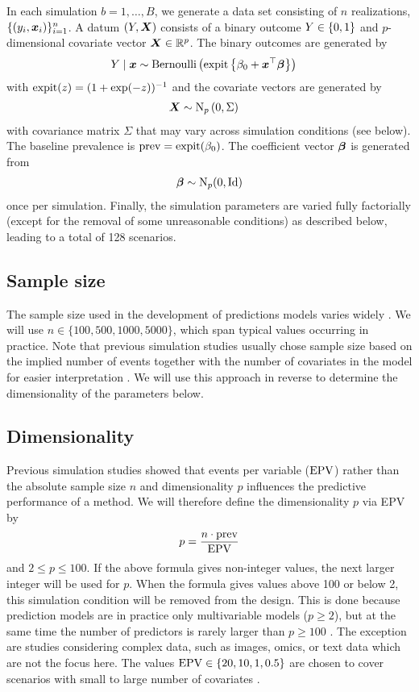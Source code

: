 In each simulation $b = 1, \dots, B$, we generate a data set consisting of $n$
realizations, \ie $\{(y_i, \text{\boldmath$x$}_i)\}_{i=1}^n$. A datum $(Y, \text{\boldmath$X$})$ consists of
a binary outcome $Y \in \{0, 1\}$ and $p$-dimensional covariate vector
$\text{\boldmath$X$} \in \mathbb{R}^p$. The binary outcomes are generated by
\begin{align*}
  Y \mid \text{\boldmath$x$} &\sim \operatorname{Bernoulli}\left(\operatorname{expit}\left\{\beta_0 +
	\text{\boldmath$x$}^\top\text{\boldmath$\beta$}\right\}\right)
\end{align*}
with $\operatorname{expit}(z) = (1 + \exp(-z))^{-1}$ and the covariate vectors are generated by
\begin{align*}
  \text{\boldmath$X$} &\sim \operatorname{N}_p\left(0, \Sigma\right)
\end{align*}
with covariance matrix $\Sigma$ that may vary across simulation conditions (see
below). The baseline prevalence is $\operatorname{prev} = \operatorname{expit}(\beta_0)$. The coefficient
vector $\text{\boldmath$\beta$}$ is generated from
\begin{align*}
  \text{\boldmath$\beta$} \sim \operatorname{N}_p(0, \operatorname{Id})
\end{align*}
once per simulation. Finally, the simulation parameters are varied fully
factorially (except for the removal of some unreasonable conditions) as
described below, leading to a total of 128 scenarios.

\subsection*{Sample size}
The sample size used in the development of predictions models varies widely
\citep{Damen2016}. We will use $n \in \{100, 500, 1000, 5000\}$, which span
typical values occurring in practice. Note that previous simulation studies
usually chose sample size based on the implied number of events together with
the number of covariates in the model for easier interpretation
\citep{vanSmeden2018, Riley2018}. We will use this approach in reverse to
determine the dimensionality of the parameters below.

\subsection*{Dimensionality}
Previous simulation studies showed that events per variable ($\operatorname{EPV}$) rather than
the absolute sample size $n$ and dimensionality $p$ influences the predictive
performance of a method. We will therefore define the dimensionality $p$ via EPV
by $$p = \frac{n \cdot \operatorname{prev}}{\operatorname{EPV}}$$ and $2 \leq p \leq 100.$ If the above
formula gives non-integer values, the next larger integer will be used for $p$.
When the formula gives values above 100 or below 2, this simulation condition
will be removed from the design. This is done because prediction models are in
practice only multivariable models ($p \geq 2$), but at the same time the number
of predictors is rarely larger than $p \geq 100$
\citep{Kreuzberger2020,Seker2020, Wynants2020}. The exception are studies
considering complex data, such as images, omics, or text data which are not the
focus here. The values $\operatorname{EPV} \in \{20, 10, 1, 0.5\}$ are chosen to cover
scenarios with small to large number of covariates \citep[see][]{vanSmeden2018}.

